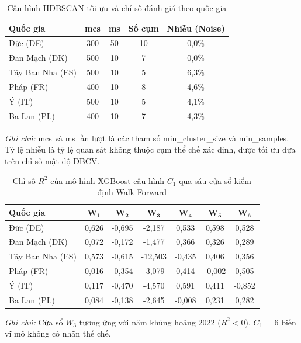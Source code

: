 \begin{table}[h!]
\caption{Cấu hình HDBSCAN tối ưu và chỉ số đánh giá theo quốc gia}
\label{tab:hdbscan_results}
\centering
\small
\begin{tabular}{@{}l c c c c@{}}
\toprule
Quốc gia & mcs & ms & Số cụm & Nhiễu (Noise) \\
\midrule
Đức (DE) & 300 & 50 & 10 & 0,0\% \\
Đan Mạch (DK) & 500 & 10 & 7 & 0,0\% \\
Tây Ban Nha (ES) & 500 & 10 & 5 & 6,3\% \\
Pháp (FR) & 400 & 10 & 8 & 4,6\% \\
Ý (IT) & 500 & 10 & 5 & 4,1\% \\
Ba Lan (PL) & 400 & 10 & 7 & 4,3\% \\
\bottomrule
\end{tabular}
\vspace{0.15cm}
\begin{minipage}{\columnwidth}
\small\textit{Ghi chú:} mcs và ms lần lượt là các tham số min\_cluster\_size và min\_samples. Tỷ lệ nhiễu là tỷ lệ quan sát không thuộc cụm thể chế xác định, được tối ưu dựa trên chỉ số mật độ DBCV.
\end{minipage}
\end{table}

\begin{table}[h!]
  \centering
  \footnotesize
  \setlength{\tabcolsep}{3.5pt}
  \caption{Chỉ số $R^2$ của mô hình XGBoost cấu hình $C_1$ qua sáu cửa sổ kiểm định Walk-Forward}
  \label{tab:wf_r2}
  \vspace{0.1cm}
  \begin{tabular*}{\columnwidth}{@{\extracolsep{\fill}}lcccccc@{}}
    \toprule
    \textbf{Quốc gia} & $\mathbf{W_1}$ & $\mathbf{W_2}$ & $\mathbf{W_3}$ & $\mathbf{W_4}$ & $\mathbf{W_5}$ & $\mathbf{W_6}$ \\
    \midrule
    Đức (DE)         & 0,626 & -0,695 & -2,187 & 0,533 & 0,598 & 0,528 \\
    Đan Mạch (DK)    & 0,072 & -0,172 & -1,477 &  0,366 & 0,326 & 0,289 \\
    Tây Ban Nha (ES) & 0,573 & -0,615 & -12,503 &  -0,435 & 0,406 & 0,356 \\
    Pháp (FR)        & 0,016 & -0,354 & -3,079 &  0,414 & -0,002 & 0,505 \\
    Ý (IT)           & 0,117 & -0,470 & -4,570 &  0,591 & 0,411 & -0,852 \\
    Ba Lan (PL)      & 0,084 & -0,138 & -2,645 & -0,008 & 0,231 & 0,282 \\
    \bottomrule
  \end{tabular*}
  \vspace{0.1cm}
  \begin{minipage}{\columnwidth}
    \footnotesize \textit{Ghi chú:} Cửa sổ $W_3$ tương ứng với năm khủng hoảng 2022 ($R^2 < 0$). $C_1$ = 6 biến vĩ mô không có nhãn thể chế.
  \end{minipage}
\end{table}


